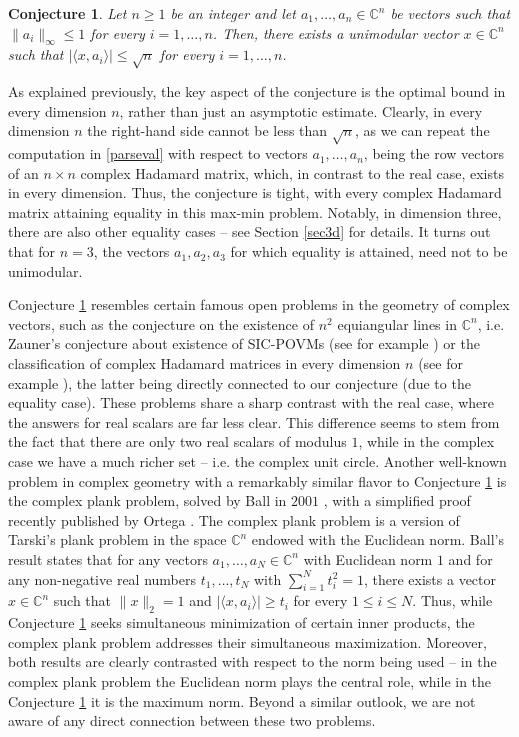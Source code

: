 \documentclass[12pt, a4paper]{article}
\theoremstyle{plain} %
\newtheorem{conjecture}[theorem]{Conjecture}
\theoremstyle{definition} %
\theoremstyle{remark} %
\begin{document}
\begin{conjecture}
\label{conj1}
Let $n \geq 1$ be an integer and let $a_1, \ldots, a_n \in \mathbb{C}^n$ be vectors such that $\|a_i\|_{\infty} \leq 1$ for every $i=1, \ldots, n$. Then, there exists a unimodular vector $x \in \mathbb{C}^n$ such that $|\langle x, a_i \rangle| \leq \sqrt{n}$ for every $i=1, \ldots, n$.
\end{conjecture}

As explained previously, the key aspect of the conjecture is the optimal bound in every dimension $n$, rather than just an asymptotic estimate. Clearly, in every dimension $n$ the right-hand side cannot be less than $\sqrt{n}$, as we can repeat the computation in \eqref{parseval} with respect to vectors $a_1, \ldots, a_n$, being the row vectors of an $n \times n$ complex Hadamard matrix, which, in contrast to the real case, exists in every dimension. Thus, the conjecture is tight, with every complex Hadamard matrix attaining equality in this max-min problem. Notably, in dimension three, there are also other equality cases -- see Section \ref{sec3d} for details. It turns out that for $n=3$, the vectors $a_1, a_2, a_3$ for which equality is attained, need not to be unimodular.


Conjecture \ref{conj1} resembles certain famous open problems in the geometry of complex vectors, such as the conjecture on the existence of $n^2$ equiangular lines in $\mathbb{C}^n$, i.e. Zauner's conjecture about existence of SIC-POVMs (see for example \cite{sic-povm}) or the classification of complex Hadamard matrices in every dimension $n$ (see for example \cite{tadej}), the latter being directly connected to our conjecture (due to the equality case). These problems share a sharp contrast with the real case, where the answers for real scalars are far less clear. This difference seems to stem from the fact that there are only two real scalars of modulus $1$, while in the complex case we have a much richer set -- i.e. the complex unit circle. Another well-known problem in complex geometry with a remarkably similar flavor to Conjecture \ref{conj1} is the complex plank problem, solved by Ball in $2001$ \cite{ball}, with a simplified proof recently published by Ortega \cite{ortega}. The complex plank problem is a version of Tarski's plank problem in the space $\mathbb{C}^n$ endowed with the Euclidean norm. Ball's result states that for any vectors $a_1, \ldots, a_N \in \mathbb{C}^n$ with Euclidean norm $1$ and for any non-negative real numbers $t_1, \ldots, t_N$ with $\sum_{i=1}^{N} t_i^2 = 1$, there exists a vector $x \in \mathbb{C}^n$ such that $\|x\|_2=1$ and $|\langle x, a_i \rangle | \geq t_i $ for every $1 \leq i \leq N$. Thus, while Conjecture \ref{conj1} seeks simultaneous minimization of certain inner products, the complex plank problem addresses their simultaneous maximization. Moreover, both results are clearly contrasted with respect to the norm being used -- in the complex plank problem the Euclidean norm plays the central role, while in the Conjecture \ref{conj1} it is the maximum norm. Beyond a similar outlook, we are not aware of any direct connection between these two problems.
\end{document}
